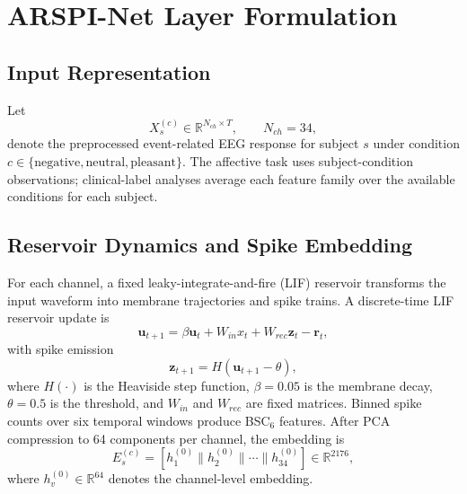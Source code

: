 \documentclass[journal]{IEEEtran}
\begin{document}
\section{ARSPI-Net Layer Formulation}
\subsection{Input Representation}
Let
\begin{equation}
X_s^{(c)} \in \mathbb{R}^{N_{ch}\times T}, \qquad N_{ch}=34,
\end{equation}
denote the preprocessed event-related EEG response for subject $s$ under condition $c\in\{\mathrm{negative},\mathrm{neutral},\mathrm{pleasant}\}$. The affective task uses subject-condition observations; clinical-label analyses average each feature family over the available conditions for each subject.

\subsection{Reservoir Dynamics and Spike Embedding}
For each channel, a fixed leaky-integrate-and-fire (LIF) reservoir transforms the input waveform into membrane trajectories and spike trains. A discrete-time LIF reservoir update is
\begin{equation}
\mathbf{u}_{t+1}=\beta\mathbf{u}_{t}+W_{in}x_t+W_{rec}\mathbf{z}_t-\mathbf{r}_t,
\label{eq:lif}
\end{equation}
with spike emission
\begin{equation}
\mathbf{z}_{t+1}=H(\mathbf{u}_{t+1}-\theta),
\label{eq:spike}
\end{equation}
where $H(\cdot)$ is the Heaviside step function, $\beta=0.05$ is the membrane decay, $\theta=0.5$ is the threshold, and $W_{in}$ and $W_{rec}$ are fixed matrices. Binned spike counts over six temporal windows produce BSC$_6$ features. After PCA compression to 64 components per channel, the embedding is
\begin{equation}
E_s^{(c)}=\left[h_1^{(0)}\|h_2^{(0)}\|\cdots\|h_{34}^{(0)}\right]\in\mathbb{R}^{2176},
\label{eq:E}
\end{equation}
where $h_v^{(0)}\in\mathbb{R}^{64}$ denotes the channel-level embedding.
\end{document}

